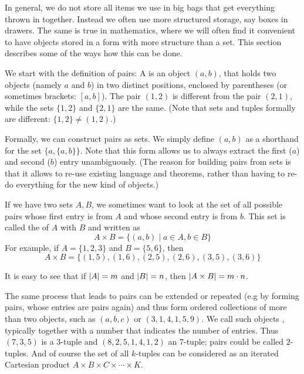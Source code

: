 In general, we do not store all items we use in big bags that get everything
thrown in together. Instead we often use more structured storage, say boxes
in drawers.
The same is true in mathematics,
where we will often find it convenient to have objects stored in a form with
more structure than a set. This section describes some of the ways how this
can be done.

We start with the definition of pairs: A  is an object $(a,b)$,
that holds two objects (namely $a$ and $b$) in two distinct positions,
enclosed by parentheses (or sometimes brackets: $[a,b]$). The
pair $(1,2)$ is different from the pair $(2,1)$, while the sets $\{1,2\}$
and $\{2,1\}$ are the same. (Note that sets and tuples formally are
different: $\{1,2\}\not=(1,2)$.)

Formally, we can construct pairs as sets. We simply define $(a,b)$ as a
shorthand for the set $\{a,\{a,b\}\}$. Note that this form allows us to
always extract the first ($a$) and second ($b$) entry unambiguously. (The
reason for building pairs from sets is that it allows to re-use existing
language and theorems, rather than having to re-do everything for the new
kind of objects.)
\medskip

If we have two sets $A,B$, we sometimes want to look at the set of all
possible pairs whose first entry is from $A$ and whose second entry is from
$b$.
This set is called the 
of $A$ with
$B$ and written as
\[
A\times B=\{(a,b)\mid a\in A,b\in B\}
\]
For example, if $A=\{1,2,3\}$ and $B=\{5,6\}$, then
\[
A\times B=\{(1,5),(1,6),(2,5),(2,6),(3,5),(3,6)\}
\]

It is easy to see that if $\left|A\right|=m$ and $\left|B\right|=n$, then $\left|A\times
B\right|=m\cdot n$.
\medskip

The same process that leads to pairs can be extended or repeated (e.g by
forming pairs, whose entries are pairs again) and thus form ordered
collections of more than two objects, such as $(a,b,c)$ or $(3,1,4,1,5,9)$.
We call such objects ,
typically together with a number that
indicates the number of entries.
Thus $(7,3,5)$ is a $3$-tuple and $(8,2,5,1,4,1,2)$ an $7$-tuple; pairs
could be called $2$-tuples.
And of course the set of all $k$-tuples can be considered as an iterated
Cartesian product $A\times B\times C\times\cdots\times K$.
\medskip

